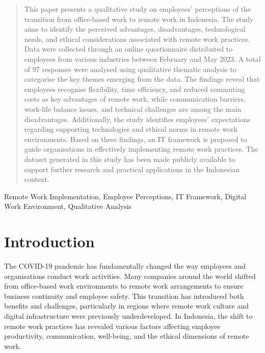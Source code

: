 \documentclass[a4paper, conference]{IEEEtran}
\begin{document}
\newcommand{\al}[1]{{\textbf{\color{blue} Al: #1}}}

\maketitle

\begin{abstract}
	This paper presents a qualitative study on employees' perceptions of the transition from office-based work to remote work in Indonesia. The study aims to identify the perceived advantages, disadvantages, technological needs, and ethical considerations associated with remote work practices. Data were collected through an online questionnaire distributed to employees from various industries between February and May 2023. A total of 97 responses were analysed using qualitative thematic analysis to categorise the key themes emerging from the data. The findings reveal that employees recognise flexibility, time efficiency, and reduced commuting costs as key advantages of remote work, while communication barriers, work-life balance issues, and technical challenges are among the main disadvantages. Additionally, the study identifies employees' expectations regarding supporting technologies and ethical norms in remote work environments. Based on these findings, an IT framework is proposed to guide organisations in effectively implementing remote work practices. The dataset generated in this study has been made publicly available to support further research and practical applications in the Indonesian context.
\end{abstract}


\begin{IEEEkeywords}
Remote Work Implementation, Employee Perceptions, IT Framework, Digital Work Environment, Qualitative Analysis
\end{IEEEkeywords}


\section{Introduction}
The COVID-19 pandemic has fundamentally changed the way employees and organisations conduct work activities. Many companies around the world shifted from office-based work environments to remote work arrangements to ensure business continuity and employee safety. This transition has introduced both benefits and challenges, particularly in regions where remote work culture and digital infrastructure were previously underdeveloped. In Indonesia, the shift to remote work practices has revealed various factors affecting employee productivity, communication, well-being, and the ethical dimensions of remote work.
\end{document}

